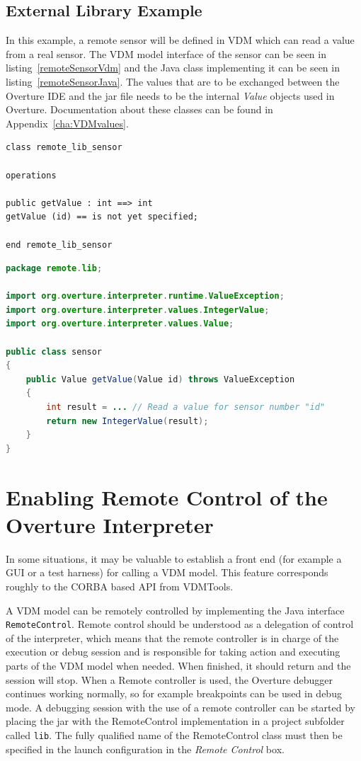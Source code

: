 \documentclass{overturerepchap}
\begin{document}
\subsection{External Library Example}
In this example, a remote sensor will be defined in VDM which can read a
value from a real sensor. The VDM model interface of the sensor can be
seen in listing~\ref{remoteSensorVdm} and the Java class
implementing it can be seen in listing~\ref{remoteSensorJava}. The
values that are to be exchanged between the Overture IDE and the jar
file needs to be the internal \emph{Value} objects used in Overture. Documentation about
these classes can be found in Appendix~\ref{cha:VDMvalues}.

\begin{lstlisting}[language=VDM++,label=remoteSensorVdm,caption=Remote sensor VDM class,captionpos=b]
class remote_lib_sensor

operations

public getValue : int ==> int
getValue (id) == is not yet specified;

end remote_lib_sensor
\end{lstlisting}


\begin{lstlisting}[language=JAVA,label=remoteSensorJava,caption=Remote sensor Java class,captionpos=b]
package remote.lib;

import org.overture.interpreter.runtime.ValueException;
import org.overture.interpreter.values.IntegerValue;
import org.overture.interpreter.values.Value;

public class sensor
{
	public Value getValue(Value id) throws ValueException
	{
		int result = ... // Read a value for sensor number "id"
		return new IntegerValue(result);
	}
}
\end{lstlisting}
\newpage
\section{Enabling Remote Control of the Overture Interpreter}\label{sec:remote}\label{sec:Remote}

In some situations, it may be valuable to establish a
front end (for example a GUI or a test harness) for calling a VDM model.
This feature corresponds roughly to the CORBA based API from VDMTools\cite{APIMan}.

A VDM model can be remotely controlled by implementing the Java interface \texttt{RemoteControl}. Remote control should be understood as a delegation of control of the interpreter, which means that the remote controller is in charge of the execution or debug session and is responsible for taking action and executing parts of the VDM model when needed. When finished, it should return and the session will stop. When a Remote controller is used, the Overture debugger continues working normally, so for example breakpoints can be used in debug mode. A debugging session with the use of a remote controller can be started by placing the  jar with the RemoteControl implementation in a project subfolder called \texttt{lib}. The fully qualified name of the RemoteControl class must then be specified in the launch configuration in the \textit{Remote Control} box.
\end{document}
